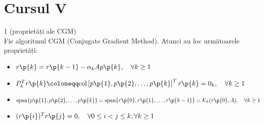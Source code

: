 
\section*{Cursul V}

\begin{teorema}{1 (proprietăți ale CGM)}
    \text{ }\\[0.5em]
    Fie algoritmul CGM (Conjugate Gradient Method). Atunci au loc următoarele proprietăți:

    \begin{itemize}
        \item[(i)] $r\p{k} = r\p{k-1} - \alpha_k A p\p{k}, \quad \forall k \ge 1$
        \item[(ii)] $P_k^T r\p{k} \coloneqq \text{col} \left[ p\p{1}, p\p{2}, \dots, p\p{k} \right]^T r\p{k} = 0_k, \quad \forall k \ge 1$
        \item[(iii)] $\text{span} \{ p\p{1}, p\p{2}, \dots, p\p{k} \} = \text{span} \{ r\p{0}, r\p{1}, \dots, r\p{k-1} \} = \mathcal{K}_k(r\p{0}, A), \quad \forall k \ge 1$
        \item[(iv)] $(r\p{i})^T r\p{j} = 0, \quad \forall 0 \le i < j \le k, \forall k \ge 1$
    \end{itemize}

\end{teorema}

